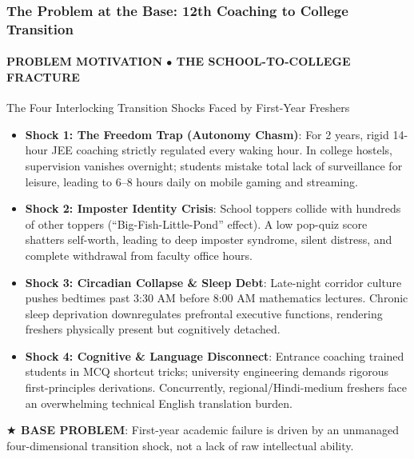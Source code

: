 \documentclass[aspectratio=169, 10pt]{beamer}
\newcommand{\leadbullet}[2]{\textbf{\color{NavyDark}#1}: \color{TextBody}#2}
\begin{document}
\begin{frame}
  \frametitle{The Problem at the Base: 12th Coaching to College Transition}
  \framesubtitle{PROBLEM MOTIVATION $\bullet$ THE SCHOOL-TO-COLLEGE FRACTURE}

  \begin{defensecard}{The Four Interlocking Transition Shocks Faced by First-Year Freshers}
    \begin{itemize}\setlength{\itemsep}{3pt}\setlength{\parskip}{0pt}\fontsize{8.5pt}{10.8pt}\selectfont
      \item \leadbullet{Shock 1: The Freedom Trap (Autonomy Chasm)}{For 2 years, rigid 14-hour JEE coaching strictly regulated every waking hour. In college hostels, supervision vanishes overnight; students mistake total lack of surveillance for leisure, leading to 6--8 hours daily on mobile gaming and streaming.}
      \item \leadbullet{Shock 2: Imposter Identity Crisis}{School toppers collide with hundreds of other toppers (``Big-Fish-Little-Pond'' effect). A low pop-quiz score shatters self-worth, leading to deep imposter syndrome, silent distress, and complete withdrawal from faculty office hours.}
      \item \leadbullet{Shock 3: Circadian Collapse \& Sleep Debt}{Late-night corridor culture pushes bedtimes past 3:30 AM before 8:00 AM mathematics lectures. Chronic sleep deprivation downregulates prefrontal executive functions, rendering freshers physically present but cognitively detached.}
      \item \leadbullet{Shock 4: Cognitive \& Language Disconnect}{Entrance coaching trained students in MCQ shortcut tricks; university engineering demands rigorous first-principles derivations. Concurrently, regional/Hindi-medium freshers face an overwhelming technical English translation burden.}
    \end{itemize}
  \end{defensecard}
  \vspace{-0.1cm}

  \begin{takeawaybanner}
    \textbf{\color{GoldPill}$\bigstar$ BASE PROBLEM}: First-year academic failure is driven by an unmanaged four-dimensional transition shock, not a lack of raw intellectual ability.
  \end{takeawaybanner}
\end{frame}
\end{document}
